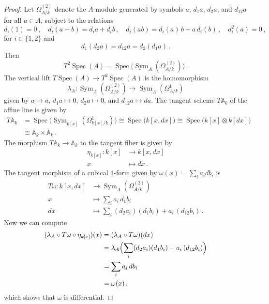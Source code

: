 \documentclass[12pt,reqno, a4paper]{amsart}
\numberwithin{equation}{section}
\theoremstyle{plain}
\theoremstyle{definition}
\theoremstyle{remark}
\newcommand{\bbA}{\mathbb{A}}
\newcommand{\Val}{\eta}
\DeclareMathOperator{\Sym}{Sym}
\DeclareMathOperator{\Spec}{Spec}
\begin{document}
\begin{proof}
Let $\Omega^{(2)}_{A/k}$ denote the $A$-module generated by symbols $a$, $d_1 a$, $d_2 a$, and $d_{12} a$ for all $a \in A$, subject to the relations
\begin{equation}
\label{eq:Schemes1}
  d_i (1) = 0 \,,\quad
  d_i(a + b) = d_i a + d_i b \,,\quad
  d_i(ab) =  d_i(a)\, b + a \, d_i(b) \,,\quad
  d_i^2(a) = 0 \,,
\end{equation}
for $i \in \{1,2\}$ and
\begin{equation*}
  d_1 (d_2 a)
  = d_{12} a
  = d_2 (d_1 a)
  \,.
\end{equation*}
Then
\begin{equation*}
  T^2 \Spec(A) =  \Spec\bigl( \Sym_A(\Omega^{(2)}_{A/k}) \bigr)
  \,.
\end{equation*}
The vertical lift $T\Spec(A) \to T^2 \Spec(A)$ is the homomorphism
\begin{equation*}
  \lambda_A: \Sym_A(\Omega^{(2)}_{A/k}) \to \Sym_A(\Omega^1_{A/k})
\end{equation*}
given by $a \mapsto a$, $d_1 a \mapsto 0$, $d_2 a \mapsto 0$, and $d_{12} a \mapsto da$. The tangent scheme $T\bbA_k$ of the affine line is given by
\begin{equation*}
\begin{split}
  T\bbA_k
  &= \Spec\bigl( \Sym_{k[x]}(\Omega^1_{k[x]/k}) \bigr)
  \cong \Spec\bigl( k[x, dx] \bigr)
  \cong \Spec\bigl( k[x] \otimes k[dx] \bigr)
  \\
  &\cong
  \bbA_k \times \bbA_k
  \,.
\end{split}
\end{equation*}
The morphism $T\bbA_k \to \bbA_k$ to the tangent fiber is given by
\begin{align*}
  \Val_{k[x]}: k[x]
  &\longrightarrow k[x, dx]
  \\
  x
  &\longmapsto dx
  \,.
\end{align*}
The tangent morphism of a cubical $1$-form given by $\omega(x) = \sum_i a_i db_i$ is
\begin{align*}
  T\omega: k[x,dx]
  &\longrightarrow \Sym_A(\Omega^{(2)}_{A/k})
  \\
  x &\longmapsto \sum_i a_i\, d_1 b_i
  \\
  dx &\longmapsto \sum_i (d_2 a_i)(d_1 b_i) + a_i\, (d_{12} b_i)
  \,.
\end{align*}
Now we can compute
\begin{equation*}
\begin{split}
  (\lambda_A \circ T\omega \circ \Val_{k[x]})(x)
  &=
  (\lambda_A \circ T\omega)(dx)
  \\
  &= \lambda_A\Bigl(
  \sum_i (d_2 a_i)(d_1 b_i) + a_i\, (d_{12} b_i) \Bigr)
  \\
  &=
  \sum_i a_i\, db_i
  \\
  &= \omega(x)
  \,,
\end{split}
\end{equation*}
which shows that $\omega$ is differential.
\end{proof}
\end{document}
